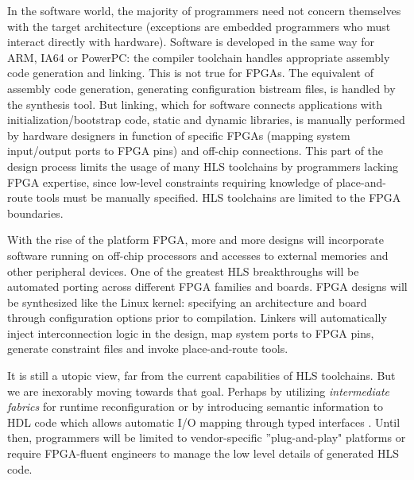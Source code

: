 In the software world, the majority of programmers need not concern themselves with the target architecture (exceptions are embedded programmers who must interact directly with hardware). Software is developed in the same way for ARM, IA64 or PowerPC: the compiler toolchain handles appropriate assembly code generation and linking. This is not true for FPGAs. The equivalent of assembly code generation, generating configuration bistream files, is handled by the synthesis tool. But linking, which for software connects applications with initialization/bootstrap code, static and dynamic libraries, is manually performed by hardware designers in function of specific FPGAs (mapping system input/output ports to FPGA pins) and off-chip connections. This part of the design process limits the usage of many HLS toolchains by programmers lacking FPGA expertise, since low-level constraints requiring knowledge of place-and-route tools must be manually specified. HLS toolchains are limited to the FPGA boundaries.
\par With the rise of the platform FPGA, more and more designs will incorporate software running on off-chip processors and accesses to external memories and other peripheral devices. One of the greatest HLS breakthroughs will be automated porting across different FPGA families and boards. FPGA designs will be synthesized like the Linux kernel: specifying an architecture and board through configuration options prior to compilation. Linkers will automatically inject interconnection logic in the design, map system ports to FPGA pins, generate constraint files and invoke place-and-route tools.  
\par It is still a utopic view, far from the current capabilities of HLS toolchains. But we are inexorably moving towards that goal. Perhaps by utilizing \textit{intermediate fabrics} for runtime reconfiguration \cite{coole2010intermediate} or by introducing semantic information to HDL code which allows automatic I/O mapping through typed interfaces \cite{7294024}. Until then, programmers will be limited to vendor-specific ''plug-and-play" platforms or require FPGA-fluent engineers to manage the low level details of generated HLS code. 


